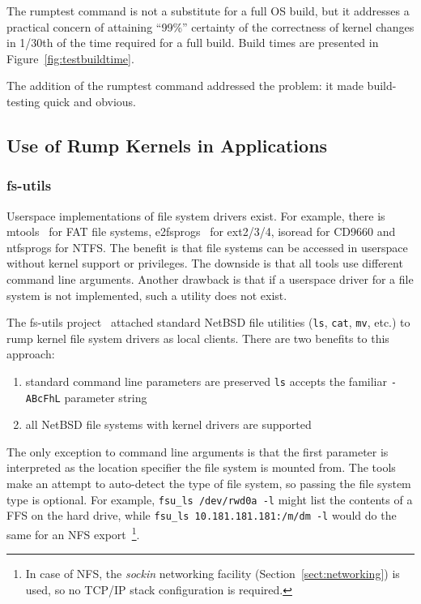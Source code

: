 The rumptest command is not a substitute for a full OS build, but
it addresses a practical concern of attaining ``99\%'' certainty
of the correctness of kernel changes in 1/30th of the time
required for a full build.  Build times are presented in
Figure~\ref{fig:testbuildtime}.

The addition of the rumptest command addressed the problem: it made
build-testing quick and obvious.

\subsection{Use of Rump Kernels in Applications}

\subsubsection{fs-utils}
\label{sect:fs-utils}

Userspace implementations of file system drivers
exist.  For example, there is mtools~\cite{mtools} for FAT
file systems, e2fsprogs~\cite{e2fsprogs} for ext2/3/4, isoread for
CD9660 and ntfsprogs for NTFS.  The benefit is that file systems
can be accessed in userspace without kernel support or privileges.
The downside is that all tools use different command line arguments.
Another drawback is that if a userspace driver for a file system
is not implemented, such a utility does not exist.

The fs-utils project~\cite{ysmal:fs-utils} attached standard NetBSD
file utilities (\texttt{ls}, \texttt{cat}, \texttt{mv}, etc.) to rump
kernel file system drivers as local clients.  There are two benefits
to this approach:

\begin{enumerate}
\item standard command line parameters are preserved \ie \texttt{ls}
accepts the familiar \texttt{-ABcFhL} parameter string

\item all NetBSD file systems with kernel drivers are supported
\end{enumerate}

The only exception to command line arguments is that the first parameter
is interpreted as the location specifier the file system is mounted from.
The tools make an attempt to auto-detect the type of file system, so passing the file system
type is optional.  For example, \verb+fsu_ls /dev/rwd0a -l+ might list
the contents of
a FFS on the hard drive, while \verb+fsu_ls 10.181.181.181:/m/dm -l+
would do the same for an NFS
export~\footnote
{
	In case of NFS, the \textit{sockin} networking facility
	(Section~\ref{sect:networking}) is used, so no TCP/IP stack
	configuration is required.
}.

